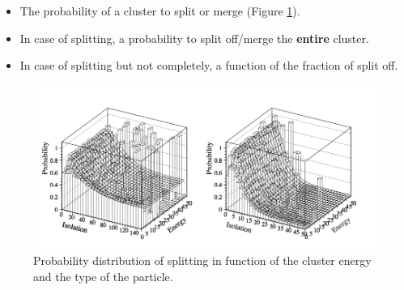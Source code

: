 \begin{itemize}
  \item The probability of a cluster to split or merge (Figure \ref{fig:proba_split}).
  \item In case of splitting, a probability to split off/merge the \textbf{entire} cluster.
  \item In case of splitting but not completely, a function of the fraction of split off.
\end{itemize}
\begin{figure}[t]
  \centering
  \includegraphics[scale=0.4]{chap6/fig_SGV/prob_split.png}
  \caption{Probability distribution of splitting in function of the cluster energy and the type of the particle.}
  \label{fig:proba_split}
\end{figure}


